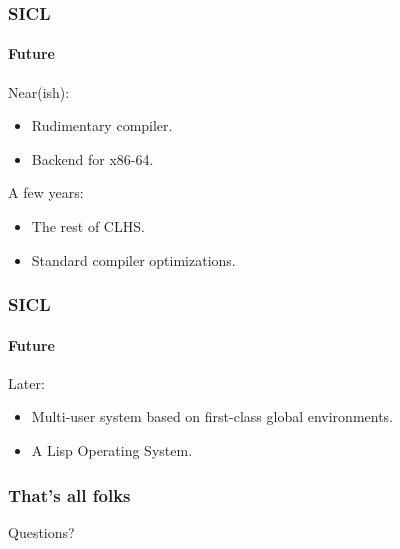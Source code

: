 \documentclass{beamer}
\begin{document}
\begin{frame}
  \frametitle{SICL}
  \framesubtitle{Future}

Near(ish):
\begin{itemize}
\item Rudimentary compiler.
\item Backend for x86-64.
\end{itemize}
\vskip 0.5cm
  
A few years:
\begin{itemize}
\item The rest of CLHS.
\item Standard compiler optimizations.
\end{itemize}

\end{frame}
\begin{frame}
  \frametitle{SICL}
  \framesubtitle{Future}
Later:
\begin{itemize}
\item Multi-user system based on first-class global environments. 
\item A Lisp Operating System.
\end{itemize}
\end{frame}
\begin{frame}
  \frametitle{That's all folks}
  
Questions?

\end{frame}
\end{document}

